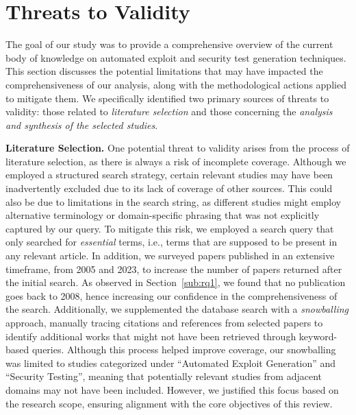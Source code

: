 
\section{Threats to Validity}
\label{sec:limitations}
The goal of our study was to provide a comprehensive overview of the current body of knowledge on automated exploit and security test generation techniques. This section discusses the potential limitations that may have impacted the comprehensiveness of our analysis, along with the methodological actions applied to mitigate them. We specifically identified two primary sources of threats to validity: those related to \emph{literature selection} and those concerning the \emph{analysis and synthesis of the selected studies}.

\smallskip
\textbf{Literature Selection.} One potential threat to validity arises from the process of literature selection, as there is always a risk of incomplete coverage.
Although we employed a structured search strategy, certain relevant studies may have been inadvertently excluded due to its lack of coverage of other sources.
This could also be due to limitations in the search string, as different studies might employ alternative terminology or domain-specific phrasing that was not explicitly captured by our query. To mitigate this risk, we employed a search query that only searched for \emph{essential} terms, i.e., terms that are supposed to be present in any relevant article. In addition, we surveyed papers published in an extensive timeframe, from 2005 and 2023, to increase the number of papers returned after the initial search. As observed in Section~\ref{sub:rq1}, we found that no publication goes back to 2008, hence increasing our confidence in the comprehensiveness of the search. Additionally, we supplemented the database search with a \textit{snowballing} approach, manually tracing citations and references from selected papers to identify additional works that might not have been retrieved through keyword-based queries. Although this process helped improve coverage, our snowballing was limited to studies categorized under ``Automated Exploit Generation'' and ``Security Testing'', meaning that potentially relevant studies from adjacent domains may not have been included. However, we justified this focus based on the research scope, ensuring alignment with the core objectives of this review.

